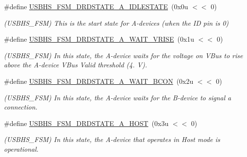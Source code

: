 \begin{DoxyCompactItemize}
\mbox{\label{group__SAMV71__USBHS_gaba646508ed0a2e2bc5b196e612838536}} 
\#define \mbox{\hyperlink{group__SAMV71__USBHS_gaba646508ed0a2e2bc5b196e612838536}{U\+S\+B\+H\+S\+\_\+\+F\+S\+M\+\_\+\+D\+R\+D\+S\+T\+A\+T\+E\+\_\+\+A\+\_\+\+I\+D\+L\+E\+S\+T\+A\+TE}}~(0x0u $<$$<$ 0)
\begin{DoxyCompactList}\small\item\em (U\+S\+B\+H\+S\+\_\+\+F\+SM) This is the start state for A-\/devices (when the ID pin is 0) \end{DoxyCompactList}\item 
\mbox{\label{group__SAMV71__USBHS_gaa5cc0eef7a3864e54f6f2de98940505b}} 
\#define \mbox{\hyperlink{group__SAMV71__USBHS_gaa5cc0eef7a3864e54f6f2de98940505b}{U\+S\+B\+H\+S\+\_\+\+F\+S\+M\+\_\+\+D\+R\+D\+S\+T\+A\+T\+E\+\_\+\+A\+\_\+\+W\+A\+I\+T\+\_\+\+V\+R\+I\+SE}}~(0x1u $<$$<$ 0)
\begin{DoxyCompactList}\small\item\em (U\+S\+B\+H\+S\+\_\+\+F\+SM) In this state, the A-\/device waits for the voltage on V\+Bus to rise above the A-\/device V\+Bus Valid threshold (4. V). \end{DoxyCompactList}\item 
\mbox{\label{group__SAMV71__USBHS_gaa1aa89b409d6b83239ceec606691fd83}} 
\#define \mbox{\hyperlink{group__SAMV71__USBHS_gaa1aa89b409d6b83239ceec606691fd83}{U\+S\+B\+H\+S\+\_\+\+F\+S\+M\+\_\+\+D\+R\+D\+S\+T\+A\+T\+E\+\_\+\+A\+\_\+\+W\+A\+I\+T\+\_\+\+B\+C\+ON}}~(0x2u $<$$<$ 0)
\begin{DoxyCompactList}\small\item\em (U\+S\+B\+H\+S\+\_\+\+F\+SM) In this state, the A-\/device waits for the B-\/device to signal a connection. \end{DoxyCompactList}\item 
\mbox{\label{group__SAMV71__USBHS_gadedc241fa17ca1f43ddebdd976b6dcbe}} 
\#define \mbox{\hyperlink{group__SAMV71__USBHS_gadedc241fa17ca1f43ddebdd976b6dcbe}{U\+S\+B\+H\+S\+\_\+\+F\+S\+M\+\_\+\+D\+R\+D\+S\+T\+A\+T\+E\+\_\+\+A\+\_\+\+H\+O\+ST}}~(0x3u $<$$<$ 0)
\begin{DoxyCompactList}\small\item\em (U\+S\+B\+H\+S\+\_\+\+F\+SM) In this state, the A-\/device that operates in Host mode is operational. \end{DoxyCompactList}\item 

\end{DoxyCompactItemize}
